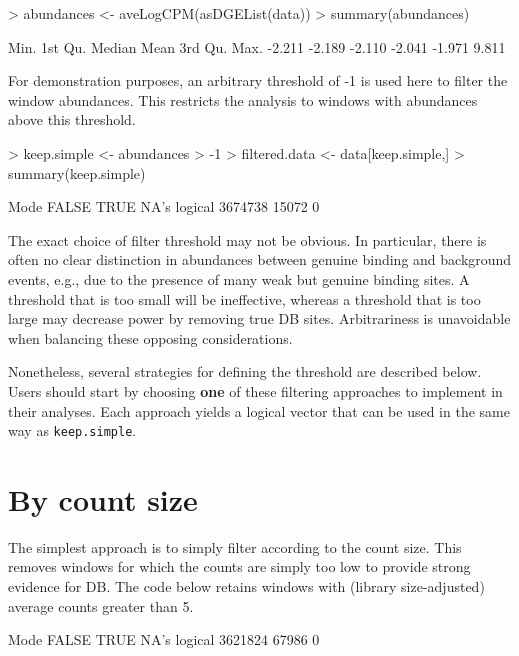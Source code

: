 \documentclass[12pt]{report}
\renewenvironment{Schunk}{\vspace{0pt}}{\vspace{0pt}}
\newcommand{\code}[1]{{\small\texttt{#1}}}
\begin{document}
\begin{Schunk}
\begin{Sinput}
> abundances <- aveLogCPM(asDGEList(data))
> summary(abundances)
\end{Sinput}
\begin{Soutput}
   Min. 1st Qu.  Median    Mean 3rd Qu.    Max. 
 -2.211  -2.189  -2.110  -2.041  -1.971   9.811 
\end{Soutput}
\end{Schunk}

For demonstration purposes, an arbitrary threshold of -1 is used here to filter the window abundances. 
This restricts the analysis to windows with abundances above this threshold.

\begin{Schunk}
\begin{Sinput}
> keep.simple <- abundances > -1
> filtered.data <- data[keep.simple,]
> summary(keep.simple)
\end{Sinput}
\begin{Soutput}
   Mode   FALSE    TRUE    NA's 
logical 3674738   15072       0 
\end{Soutput}
\end{Schunk}

The exact choice of filter threshold may not be obvious.
In particular, there is often no clear distinction in abundances between genuine binding and background events, e.g., due to the presence of many weak but genuine binding sites.
A threshold that is too small will be ineffective, whereas a threshold that is too large may decrease power by removing true DB sites.
Arbitrariness is unavoidable when balancing these opposing considerations.

Nonetheless, several strategies for defining the threshold are described below.
Users should start by choosing \textbf{one} of these filtering approaches to implement in their analyses.
Each approach yields a logical vector that can be used in the same way as \code{keep.simple}.

\section{By count size}
The simplest approach is to simply filter according to the count size.
This removes windows for which the counts are simply too low to provide strong evidence for DB.
The code below retains windows with (library size-adjusted) average counts greater than 5. 

\begin{Schunk}
\begin{Soutput}
   Mode   FALSE    TRUE    NA's 
logical 3621824   67986       0 
\end{Soutput}
\end{Schunk}
\end{document}
